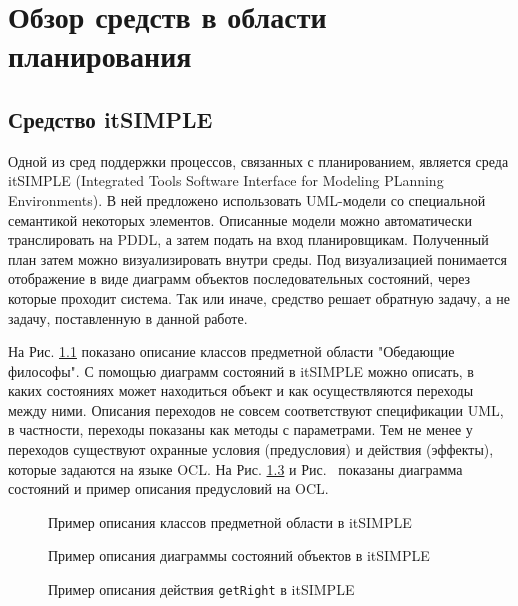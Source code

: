 \chapter{Обзор средств в области планирования}
    
\section{Средство itSIMPLE}
    Одной из сред поддержки процессов, связанных с планированием, является среда itSIMPLE \cite{itsimple} (Integrated Tools Software Interface for Modeling PLanning Environments).
 В ней предложено использовать UML-модели со специальной семантикой некоторых элементов.
 Описанные модели можно автоматически транслировать на PDDL, а затем подать на вход планировщикам.
 Полученный план затем можно визуализировать внутри среды.
 Под визуализацией понимается отображение в виде диаграмм объектов последовательных состояний, через которые проходит система.
 Так или иначе, средство решает обратную задачу, а не задачу, поставленную в данной работе.
    
    На Рис. \ref{img:its_phil_domain} показано описание классов предметной области  "Обедающие философы".
 С помощью диаграмм состояний в itSIMPLE можно описать, в каких состояниях может находиться объект и как осуществляются переходы между ними.
 Описания переходов не совсем соответствуют спецификации UML, в частности, переходы показаны как методы с параметрами.
 Тем не менее у переходов существуют охранные условия (предусловия) и действия (эффекты), которые задаются на языке OCL.
 На Рис. \ref{img:its_phil_precond} и Рис. \ показаны диаграмма состояний и пример описания предусловий на OCL.

    
    \begin{figure}[h]
        \caption{Пример описания классов предметной области в itSIMPLE}
        \label{img:its_phil_domain}

    \end{figure}
    
    \begin{figure}[h] 
        \caption{Пример описания диаграммы состояний объектов в itSIMPLE}
        \label{img:its_phil_states}

    \end{figure}
    
    \begin{figure}[h] 
        \caption{Пример описания действия \texttt{getRight} в itSIMPLE}
        \label{img:its_phil_precond}

    \end{figure}
        
